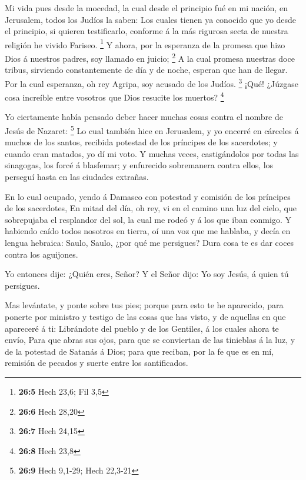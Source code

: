  Mi vida pues desde la mocedad, la cual desde el principio
fué en mi nación, en Jerusalem, todos los Judíos la saben: 
Los cuales tienen ya conocido que yo desde el principio, si quieren
testificarlo, conforme á la más rigurosa secta de nuestra religión he
vivido Fariseo. \footnote{\textbf{26:5} Hech 23,6; Fil 3,5} 
Y ahora, por la esperanza de la promesa que hizo Dios á nuestros padres,
soy llamado en juicio; \footnote{\textbf{26:6} Hech 28,20} 
A la cual promesa nuestras doce tribus, sirviendo constantemente de día
y de noche, esperan que han de llegar. Por la cual esperanza, oh rey
Agripa, soy acusado de los Judíos. \footnote{\textbf{26:7} Hech 24,15}
 ¡Qué! ¿Júzgase cosa increíble entre vosotros que Dios
resucite los muertos? \footnote{\textbf{26:8} Hech 23,8}

 Yo ciertamente había pensado deber hacer muchas cosas
contra el nombre de Jesús de Nazaret: \footnote{\textbf{26:9} Hech
  9,1-29; Hech 22,3-21}  Lo cual también hice en Jerusalem,
y yo encerré en cárceles á muchos de los santos, recibida potestad de
los príncipes de los sacerdotes; y cuando eran matados, yo dí mi voto.
 Y muchas veces, castigándolos por todas las sinagogas, los
forcé á blasfemar; y enfurecido sobremanera contra ellos, los perseguí
hasta en las ciudades extrañas.

 En lo cual ocupado, yendo á Damasco con potestad y
comisión de los príncipes de los sacerdotes,  En mitad del
día, oh rey, vi en el camino una luz del cielo, que sobrepujaba el
resplandor del sol, la cual me rodeó y á los que iban conmigo.
 Y habiendo caído todos nosotros en tierra, oí una voz que
me hablaba, y decía en lengua hebraica: Saulo, Saulo, ¿por qué me
persigues? Dura cosa te es dar coces contra los aguijones.

 Yo entonces dije: ¿Quién eres, Señor? Y el Señor dijo: Yo
soy Jesús, á quien tú persigues.

 Mas levántate, y ponte sobre tus pies; porque para esto te
he aparecido, para ponerte por ministro y testigo de las cosas que has
visto, y de aquellas en que apareceré á ti:  Librándote del
pueblo y de los Gentiles, á los cuales ahora te envío, 
Para que abras sus ojos, para que se conviertan de las tinieblas á la
luz, y de la potestad de Satanás á Dios; para que reciban, por la fe que
es en mí, remisión de pecados y suerte entre los santificados.

